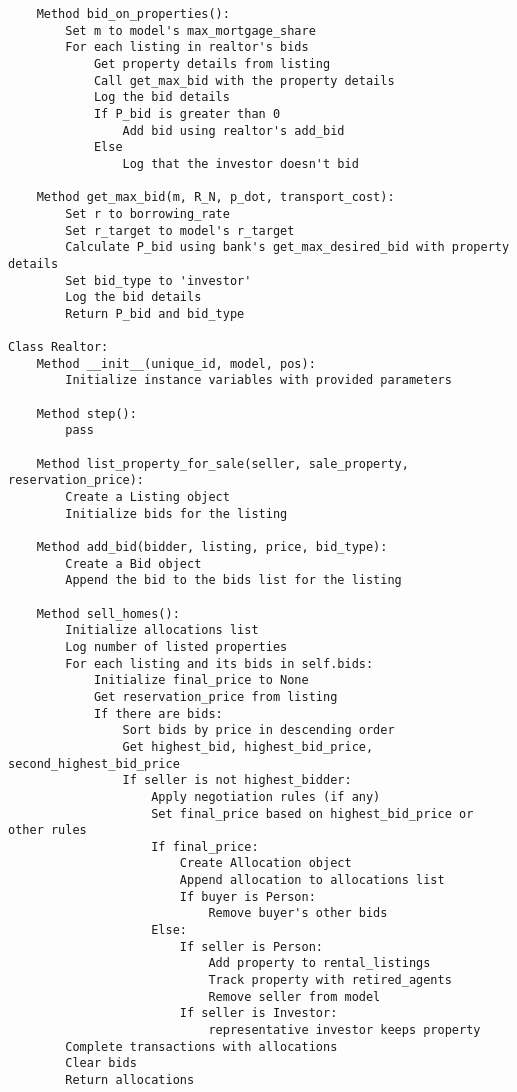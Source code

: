 {\begin{verbatim}
    Method bid_on_properties():
        Set m to model's max_mortgage_share
        For each listing in realtor's bids
            Get property details from listing
            Call get_max_bid with the property details
            Log the bid details
            If P_bid is greater than 0
                Add bid using realtor's add_bid
            Else
                Log that the investor doesn't bid

    Method get_max_bid(m, R_N, p_dot, transport_cost):
        Set r to borrowing_rate
        Set r_target to model's r_target
        Calculate P_bid using bank's get_max_desired_bid with property details
        Set bid_type to 'investor'
        Log the bid details
        Return P_bid and bid_type

Class Realtor:
    Method __init__(unique_id, model, pos):
        Initialize instance variables with provided parameters

    Method step():
        pass

    Method list_property_for_sale(seller, sale_property, reservation_price):
        Create a Listing object
        Initialize bids for the listing

    Method add_bid(bidder, listing, price, bid_type):
        Create a Bid object
        Append the bid to the bids list for the listing

    Method sell_homes():
        Initialize allocations list
        Log number of listed properties
        For each listing and its bids in self.bids:
            Initialize final_price to None
            Get reservation_price from listing
            If there are bids:
                Sort bids by price in descending order
                Get highest_bid, highest_bid_price, second_highest_bid_price
                If seller is not highest_bidder:
                    Apply negotiation rules (if any)
                    Set final_price based on highest_bid_price or other rules
                    If final_price:
                        Create Allocation object
                        Append allocation to allocations list
                        If buyer is Person:
                            Remove buyer's other bids
                    Else:
                        If seller is Person:
                            Add property to rental_listings
                            Track property with retired_agents
                            Remove seller from model
                        If seller is Investor:
                            representative investor keeps property
        Complete transactions with allocations
        Clear bids
        Return allocations


\end{verbatim}}
